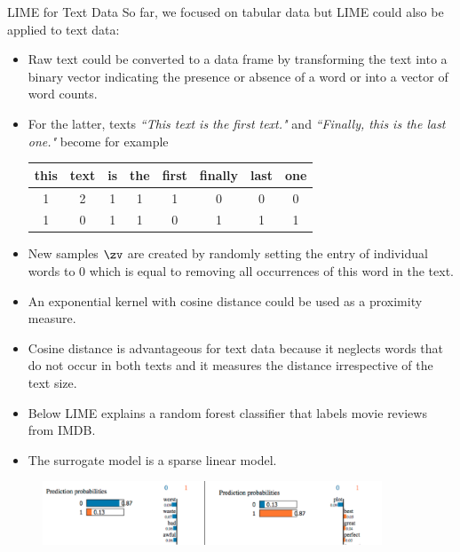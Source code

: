 \documentclass[11pt,compress,t,notes=noshow, aspectratio=169, xcolor=table]{beamer}
\begin{document}
\begin{vbframe}{LIME for Text Data}
	So far, we focused on tabular data but LIME could also be applied to text data: 
	\begin{itemize}
		\item Raw text could be converted to a data frame by transforming the text into a binary vector indicating the presence or absence of a word or into a vector of word counts.
		\item For the latter, texts \textit{``This text is the first text."} and \textit{``Finally, this is the last one."} become for example 
		\begin{center}
			\begin{tabular}{c|c|c|c|c|c|c|c} 
				this & text & is & the & first & finally & last & one \\ 
				\hline
				1 & 2 & 1 & 1 & 1 & 0 & 0 & 0 \\
				1 & 0 & 1 & 1 & 0 & 1 & 1 & 1 \\
			\end{tabular}
		\end{center} 
		\item New samples $\zv$ are created by randomly setting the entry of individual words to $0$ which is equal to removing all occurrences of this word in the text. 
		\item An exponential kernel with cosine distance could be used as a proximity measure. 
		\item Cosine distance is advantageous for text data because it neglects words that do not occur in both texts and it measures the distance irrespective of the text size. 
		\item Below LIME explains a random forest classifier that labels movie reviews from IMDB. 
		\item The surrogate model is a sparse linear model. 
	\end{itemize}
	
	\begin{figure}
		\begin{center}
			\includegraphics[width=0.9\textwidth]{figure/lime_movier}
		\end{center}
	\end{figure}
	

\end{vbframe}
\end{document}
